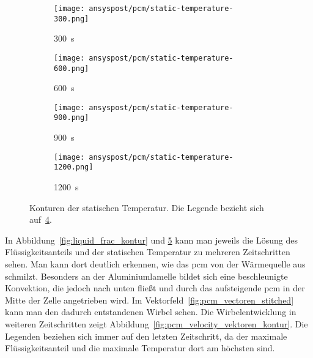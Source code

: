 \begin{figure}
\begin{minipage}[t]{0.485\textwidth}
        \label{fig:liquid_frac_kontur}
    \end{minipage}
    \hspace{2mm} %
    \begin{minipage}[t]{0.485\textwidth}
        \centering
        \begin{subfigure}[t]{0.16\textwidth}
            \centering
        \end{subfigure}%
        \hspace{2mm}%
        \begin{subfigure}[t]{0.2\textwidth}
            \centering
            \texttt{[image: ansyspost/pcm/static-temperature-300.png]}
            \caption{\SI{300}{\second}}\label{fig:temperatur_300}
        \end{subfigure}%
        \begin{subfigure}[t]{0.2\textwidth}
            \centering
            \texttt{[image: ansyspost/pcm/static-temperature-600.png]}
            \caption{\SI{600}{\second}}\label{fig:temperatur_600}
        \end{subfigure}%
        \begin{subfigure}[t]{0.2\textwidth}
            \centering
            \texttt{[image: ansyspost/pcm/static-temperature-900.png]}
            \caption{\SI{900}{\second}}\label{fig:temperatur_900}
        \end{subfigure}%
        \begin{subfigure}[t]{0.2\textwidth}
            \centering
            \texttt{[image: ansyspost/pcm/static-temperature-1200.png]}
            \caption{\SI{1200}{\second}}\label{fig:temperatur_1200}
        \end{subfigure}
        \caption{Konturen der statischen Temperatur. Die Legende bezieht sich auf~\ref{fig:temperatur_1200}.}
        \label{fig:static_temperature_kontur}
    \end{minipage}

\end{figure}

In Abbildung~\ref{fig:liquid_frac_kontur} und \ref{fig:static_temperature_kontur} kann man jeweils die Lösung des Flüssigkeitsanteils
und der statischen Temperatur zu mehreren Zeitschritten sehen. Man kann dort deutlich erkennen, wie das \ac{pcm} von der Wärmequelle aus
schmilzt. Besonders an der Aluminiumlamelle bildet sich eine beschleunigte Konvektion, die jedoch nach unten fließt und durch das aufsteigende
\ac{pcm} in der Mitte der Zelle angetrieben wird. Im Vektorfeld~\ref{fig:pcm_vectoren_stitched} kann man den dadurch entstandenen Wirbel sehen.
Die Wirbelentwicklung in weiteren Zeitschritten zeigt Abbildung~\ref{fig:pcm_velocity_vektoren_kontur}. Die Legenden beziehen sich immer auf den letzten
Zeitschritt, da der maximale Flüssigkeitsanteil und die maximale Temperatur dort am höchsten sind.

